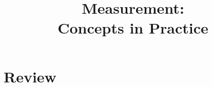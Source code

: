 
\usepackage{tikz}
\usetikzlibrary{shapes,arrows,decorations.pathreplacing,calc}


\newcommand{\nt}[2][0pt]{%
    \stepcounter{itemnum}%
    \if###2##%
    \else
        #2%
        \thinspace
    \fi
    \tikz[overlay,remember picture,baseline=(\theitemnum.base),xshift=#1]\node (\theitemnum){};%
}

\newcommand{\makebrace}[4][0pt]{%
    \begin{tikzpicture}[overlay, remember picture]
        \draw [decoration={brace,amplitude=0.5em},decorate]
        let \p1=(#2), \p2=(#3) in
        ({max(\x1+#1,\x2+#1)}, {\y1+1.75ex}) -- 
            node[right=0.6em] {#4} ({max(\x1+#1,\x2+#1)}, {\y2-0.5ex});
    \end{tikzpicture}%
}

\newenvironment{braceitems}{%
    \begin{enumerate}
}{%
    \end{enumerate}
    \setcounter{itemnum}{0}%
}


\title{Measurement:\\Concepts in Practice}


\date[]{}



\frame{\titlepage}

\frame{\tableofcontents}


\section{Review}
\frame{\tableofcontents[currentsection]}





